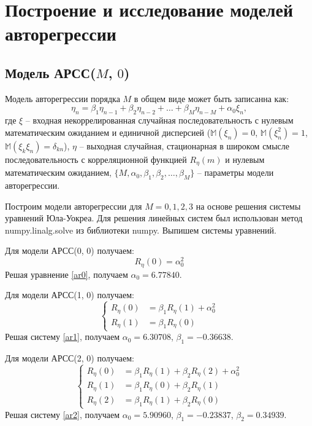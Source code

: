 \documentclass[12pt, fleqn]{article}
\begin{document}
\newpage
\section{Построение и исследование моделей авторегрессии}
{
	\subsection{Модель АРСС($M$, $0$)}
	{
		Модель авторегрессии порядка $M$ в общем виде может быть записанна как:
		\begin{equation}
			\eta_n = \beta_1\eta_{n-1} + \beta_2 \eta_{n-2} + \dots + \beta_M \eta_{n-M} +\alpha_0 \xi_n,
		\end{equation}
		где $\xi$ -- входная некоррелированная случайная последовательность с нулевым математическим ожиданием и единичной дисперсией ($\mathbb{M}(\xi_n)=0$, $\mathbb{M}(\xi^2_n)=1$, $\mathbb{M}(\xi_k \xi_n)=\delta_{kn}$), $\eta$ -- выходная случайная, стационарная в широком смысле последовательность с корреляционной функцией $R_{\eta}(m)$ и нулевым математическим ожиданием, $\{M, \alpha_0, \beta_1, \beta_2, \dots, \beta_M\}$ -- параметры модели авторегрессии.\medskip 
										      
		Построим модели авторегрессии для $M = 0,1,2,3$ на основе решения системы уравнений Юла-Уокреа. Для решения линейных систем был использован метод numpy.linalg.solve из библиотеки numpy. Выпишем системы уравнений.\medskip 
										      
		Для модели АРСС(0, 0) получаем:
		\begin{equation}\label{ar0}
			R_{\eta}(0) = \alpha^2_0
		\end{equation}
		Решая уравнение \eqref{ar0}, получаем $\alpha_0 = 6.77840$.\medskip 
										      
		Для модели АРСС(1, 0) получаем:
		\begin{equation}\label{ar1}
			\left\{
			\begin{split}
				R_{\eta}(0) &= \beta_1 R_{\eta}(1) + \alpha^2_0 \\
				R_{\eta}(1) &= \beta_1 R_{\eta}(0)
			\end{split}
			\right.
		\end{equation}
		Решая систему \eqref{ar1}, получаем $\alpha_0 = 6.30708$, $\beta_1 = -0.36638$.\medskip 
										      
		Для модели АРСС(2, 0) получаем:
		\begin{equation}\label{ar2}
			\left\{
			\begin{split}
				R_{\eta}(0) &= \beta_1 R_{\eta}(1) + \beta_2 R_{\eta}(2) + \alpha^2_0 \\
				R_{\eta}(1) &= \beta_1 R_{\eta}(0) + \beta_2 R_{\eta}(1) \\
				R_{\eta}(2) &= \beta_1 R_{\eta}(1) + \beta_2 R_{\eta}(0)
			\end{split}
			\right.
		\end{equation}
		Решая систему \eqref{ar2}, получаем $\alpha_0 = 5.90960$, $\beta_1 = -0.23837$, $\beta_2 = 0.34939$.\medskip 
										      
}}
\end{document}
